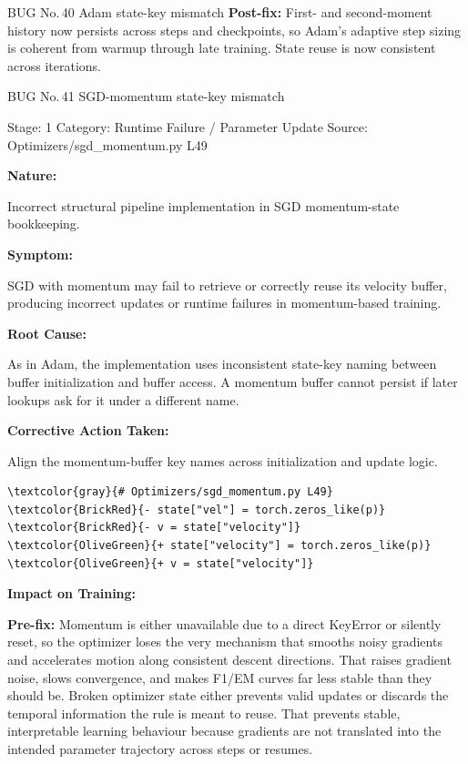 \documentclass[10pt]{article}
\newcommand{\FieldLabel}[1]{%
 {\bfseries #1:}\par
}
\begin{document}
\begin{bugbox}{BUG No.\,40 \quad Adam state-key mismatch}
\textbf{Post-fix:} First- and second-moment history now persists across steps and checkpoints, so Adam's adaptive step sizing is coherent from warmup through late training. State reuse is now consistent across iterations.
\par
\vspace{0.35em}
\end{bugbox}

\begin{bugbox}{BUG No.\,41 \quad SGD-momentum state-key mismatch}
{\color{MetaGray}\small Stage: 1 \;\textbar\; Category: Runtime Failure / Parameter Update \;\textbar\; Source: Optimizers/sgd\_momentum.py L49\par}
\vspace{0.22em}
\FieldLabel{Nature}
Incorrect structural pipeline implementation in SGD momentum-state bookkeeping.
\par
\vspace{0.35em}
\FieldLabel{Symptom}
SGD with momentum may fail to retrieve or correctly reuse its velocity buffer, producing incorrect updates or runtime failures in momentum-based training.
\par
\vspace{0.35em}
\FieldLabel{Root Cause}
As in Adam, the implementation uses inconsistent state-key naming between buffer initialization and buffer access. A momentum buffer cannot persist if later lookups ask for it under a different name.
\par
\vspace{0.35em}
\FieldLabel{Corrective Action Taken}
Align the momentum-buffer key names across initialization and update logic.
\par
\vspace{0.35em}
\begin{Verbatim}[commandchars=\\\{\},fontsize=\footnotesize,breaklines=true,breaksymbol={},frame=leftline,framerule=2pt,rulecolor=\color{gray!40},xleftmargin=6pt,formatcom=\singlespacing]
\textcolor{gray}{# Optimizers/sgd_momentum.py L49}
\textcolor{BrickRed}{- state["vel"] = torch.zeros_like(p)}
\textcolor{BrickRed}{- v = state["velocity"]}
\textcolor{OliveGreen}{+ state["velocity"] = torch.zeros_like(p)}
\textcolor{OliveGreen}{+ v = state["velocity"]}
\end{Verbatim}
\vspace{0.22em}
\FieldLabel{Impact on Training}
\textbf{Pre-fix:} Momentum is either unavailable due to a direct KeyError or silently reset, so the optimizer loses the very mechanism that smooths noisy gradients and accelerates motion along consistent descent directions. That raises gradient noise, slows convergence, and makes F1/EM curves far less stable than they should be. Broken optimizer state either prevents valid updates or discards the temporal information the rule is meant to reuse. That prevents stable, interpretable learning behaviour because gradients are not translated into the intended parameter trajectory across steps or resumes.\par\smallskip

\end{bugbox}
\end{document}
